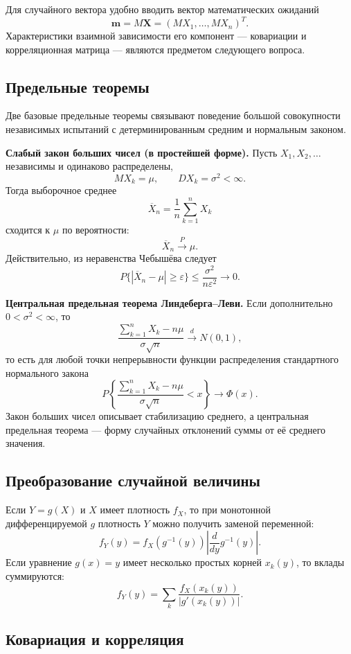 Для случайного вектора удобно вводить вектор математических ожиданий
\[
    \mathbf m=M\mathbf X=(MX_1,\ldots,MX_n)^T.
\]
Характеристики взаимной зависимости его компонент --- ковариации и
корреляционная матрица --- являются предметом следующего вопроса.

\subsection{Предельные теоремы}

Две базовые предельные теоремы связывают поведение большой совокупности
независимых испытаний с детерминированным средним и нормальным законом.

\textbf{Слабый закон больших чисел (в простейшей форме).}
Пусть $X_1,X_2,\ldots$ независимы и одинаково распределены,
\[
    MX_k=\mu,\qquad DX_k=\sigma^2<\infty.
\]
Тогда выборочное среднее
\[
    \overline X_n=\frac1n\sum_{k=1}^nX_k
\]
сходится к $\mu$ по вероятности:
\[
    \overline X_n\xrightarrow{P}\mu.
\]
Действительно, из неравенства Чебышёва следует
\[
    P\{|\overline X_n-\mu|\geq\varepsilon\}
    \leq \frac{\sigma^2}{n\varepsilon^2}
    \longrightarrow0.
\]

\textbf{Центральная предельная теорема Линдеберга--Леви.}
Если дополнительно $0<\sigma^2<\infty$, то
\[
    \frac{\sum_{k=1}^nX_k-n\mu}{\sigma\sqrt n}
    \xrightarrow{d}N(0,1),
\]
то есть для любой точки непрерывности функции распределения стандартного
нормального закона
\[
    P\left\{
      \frac{\sum_{k=1}^nX_k-n\mu}{\sigma\sqrt n}<x
    \right\}
    \longrightarrow \Phi(x).
\]
Закон больших чисел описывает стабилизацию среднего, а центральная предельная
теорема --- форму случайных отклонений суммы от её среднего значения.


\subsection{Преобразование случайной величины}

Если $Y=g(X)$ и $X$ имеет плотность $f_X$, то при монотонной дифференцируемой
$g$ плотность $Y$ можно получить заменой переменной:
\[
    f_Y(y)=f_X(g^{-1}(y))\left|\frac{d}{dy}g^{-1}(y)\right|.
\]
Если уравнение $g(x)=y$ имеет несколько простых корней $x_k(y)$, то вклады
суммируются:
\[
    f_Y(y)=\sum_k \frac{f_X(x_k(y))}{|g'(x_k(y))|}.
\]

\subsection{Ковариация и корреляция}

